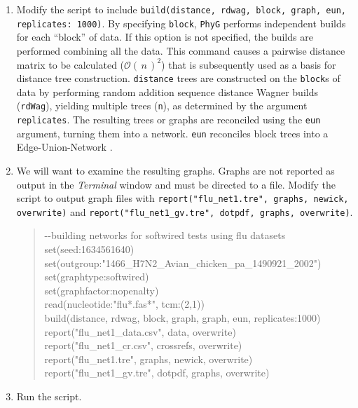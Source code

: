\documentclass[11pt]{article}
\newcommand{\phyg}{\texttt{PhyG} }
\newcommand{\BigO}[1]{\ensuremath{\mathcal{O}\left(\,#1\,\right)}\xspace}
\begin{document}
\begin{enumerate}

\item Modify the script to include \texttt{build(distance, rdwag, block, graph, eun, 
replicates: 1000)}. By specifying \texttt{block}, \phyg performs independent builds 
for each ``block'' of data. If this option is not specified, the builds are performed 
combining all the data. This command causes a pairwise distance matrix to be 
calculated ($\BigO n^2$) that is subsequently used as a basis for distance tree 
construction. \texttt{distance} trees are constructed on the \texttt{block}s of data 
by performing random addition sequence distance Wagner builds (\texttt{rdWag}), 
yielding multiple trees (\texttt{n}), as determined by the argument \texttt{replicates}. 
The resulting trees or graphs are reconciled using the \texttt{eun} argument, turning 
them into a network. \texttt{eun} reconciles block trees into a Edge-Union-Network 
\citep{MiyagiandWheeler2019, Wheeler2022}.

\item We will want to examine the resulting graphs. Graphs are not reported as 
output in the \textit{Terminal} window and must be directed to a file. Modify the 
script to output graph files with \texttt{report("flu\_net1.tre", graphs, newick, 
overwrite)} and \texttt{report("flu\_net1\_gv.tre", dotpdf, graphs, overwrite)}.

	\begin{quote}	
	-\/-building networks for softwired tests using flu datasets\\
	set(seed:1634561640)\\
	set(outgroup:"1466\_H7N2\_Avian\_chicken\_pa\_1490921\_2002")\\
	set(graphtype:softwired)\\
	set(graphfactor:nopenalty)\\ 
	read(nucleotide:"flu*.fas*", tcm:(2,1))\\
	build(distance, rdwag, block, graph, graph, eun, replicates:1000)\\
	report("flu\_net1\_data.csv", data, overwrite)\\
	report("flu\_net1\_cr.csv", crossrefs, overwrite)\\
	report("flu\_net1.tre", graphs, newick, overwrite)\\
	report("flu\_net1\_gv.tre", dotpdf, graphs, overwrite)
	\end{quote}
	
\item Run the script.


\end{enumerate}
\end{document}
